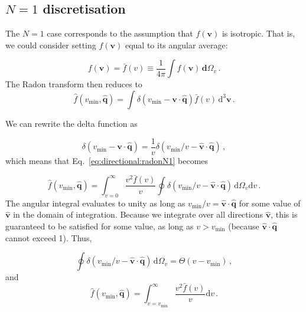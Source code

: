 
\subsection{$N=1$ discretisation}

The $N=1$ case corresponds to the assumption that $f(\textbf{v})$ is isotropic. That is, we could consider setting $f(\textbf{v})$ equal to its angular average:  

\begin{equation}
\label{eq:directional:isotropic}
f(\textbf{v}) = \bar{f}(v) \equiv \frac{1}{4\pi} \int f(\textbf{v}) \, \mathbf{d}\Omega_v\,.
\end{equation}
The Radon transform then reduces to
\begin{equation}
\label{eq:directional:radonN1}
\hat{f}\left(v_\textrm{min},\hat{\textbf{q}}\right) = \int \delta\left(v_\textrm{min} - \textbf{v}\cdot\hat{\textbf{q}}\right) \bar{f}(v) \,\textrm{d}^3\textbf{v}\,.
\end{equation}

We can rewrite the delta function as

\begin{equation}
\delta\left(v_\textrm{min} - \textbf{v}\cdot\hat{\textbf{q}}\right) = \frac{1}{v}\delta(v_\textrm{min}/v - \hat{\textbf{v}}\cdot\hat{\textbf{q}})\,, 
\end{equation}
which means that Eq.~\ref{eq:directional:radonN1} becomes  

\begin{equation}
\hat{f}\left(v_\textrm{min},\hat{\textbf{q}}\right) = \int_{v=0}^\infty \frac{v^2\bar{f}(v)}{v} \oint \delta\left(v_\textrm{min}/v - \hat{\textbf{v}}\cdot\hat{\textbf{q}}\right)  \, \mathrm{d}\Omega_v\mathrm{d}v\,.
\end{equation}
The angular integral evaluates to unity as long as $v_\textrm{min}/v = \hat{\textbf{v}}\cdot\hat{\textbf{q}}$ for some value of $\hat{\textbf{v}}$ in the domain of integration. Because we integrate over all directions $\hat{\textbf{v}}$, this is guaranteed to be satisfied for some value, as long as $v > v_\textrm{min}$ (because $\hat{\textbf{v}}\cdot\hat{\textbf{q}}$ cannot exceed 1). Thus,

\begin{equation}
\oint \delta\left(v_\textrm{min}/v - \hat{\textbf{v}}\cdot\hat{\textbf{q}}\right)  \, \mathrm{d}\Omega_v = \Theta(v - v_\textrm{min})\,,
\end{equation}
and
\begin{equation}
\hat{f}\left(v_\textrm{min},\hat{\textbf{q}}\right) = \int_{v=v_\textrm{min}}^\infty \frac{v^2\bar{f}(v)}{v} \mathrm{d}v\,.
\end{equation}

